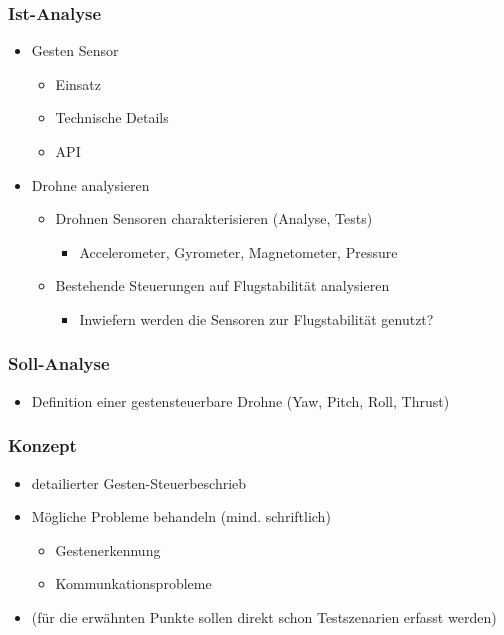 \subsubsection{Ist-Analyse}
\begin{itemize}
	\item Gesten Sensor
	\begin{itemize}
		\item Einsatz
		\item Technische Details
		\item API
	\end{itemize}
	
	\item Drohne analysieren
	\begin{itemize}
		\item Drohnen Sensoren charakterisieren (Analyse, Tests)
			\begin{itemize}
				\item Accelerometer, Gyrometer, Magnetometer, Pressure
			\end{itemize}
	\end{itemize}
	
	\begin{itemize}
		\item Bestehende Steuerungen auf Flugstabilität analysieren
		\begin{itemize}
			\item Inwiefern werden die Sensoren zur Flugstabilität genutzt?
		\end{itemize}
	\end{itemize}
\end{itemize}


\subsubsection{Soll-Analyse}
\begin{itemize}
	\item Definition einer gestensteuerbare Drohne (Yaw, Pitch, Roll, Thrust)
\end{itemize}


\subsubsection{Konzept}
\begin{itemize}
	\item detailierter Gesten-Steuerbeschrieb
	\item Mögliche Probleme behandeln (mind. schriftlich)
	\begin{itemize}
		\item Gestenerkennung
		\item Kommunkationsprobleme
	\end{itemize}
	\item (für die erwähnten Punkte sollen direkt schon Testszenarien erfasst werden)
\end{itemize}


